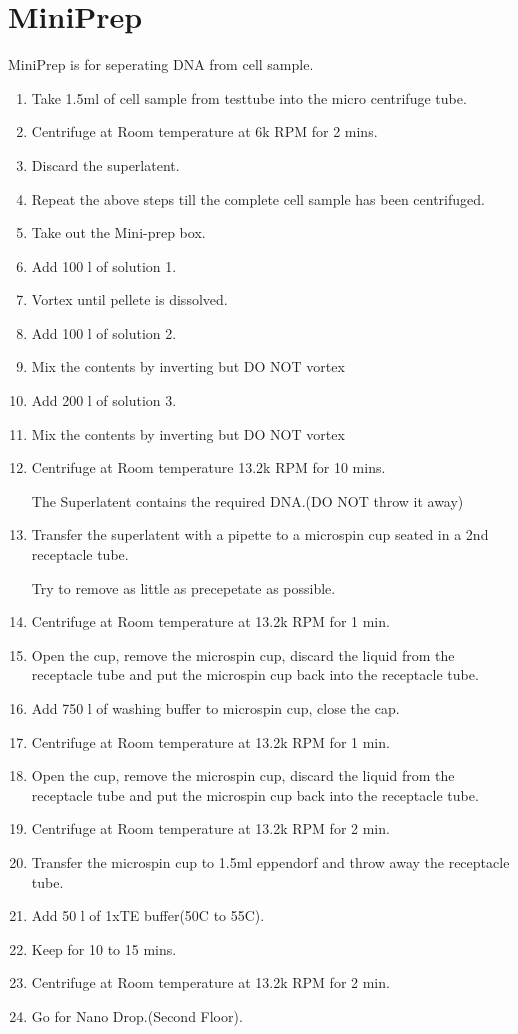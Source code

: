 \documentclass[11pt,twoside,a4paper]{article}
\begin{document}
\section{MiniPrep}
MiniPrep is for seperating DNA from cell sample.
\begin{enumerate}
	\item Take 1.5ml of cell sample from testtube into the micro centrifuge tube.
	\item Centrifuge at Room temperature at 6k RPM for 2 mins.
	\item Discard the superlatent.
	\item Repeat the above steps till the complete cell sample has been centrifuged.
	\item Take out the Mini-prep box.
	\item Add 100 \textmu{} l of solution 1.
	\item Vortex until pellete is dissolved.
	\item Add 100 \textmu{} l of solution 2.
	\item Mix the contents by inverting but DO NOT vortex
	\item Add 200 \textmu{} l of solution 3.
	\item Mix the contents by inverting but DO NOT vortex
	\item Centrifuge at Room temperature 13.2k RPM for 10 mins.

		The Superlatent contains the required DNA.(DO NOT throw it away)
	\item Transfer the superlatent with a pipette to a microspin cup seated in a 2nd receptacle tube.

		Try to remove as little as precepetate as possible.
	\item Centrifuge at Room temperature at 13.2k RPM for 1 min.
	\item Open the cup, remove the microspin cup, discard the liquid from the receptacle tube and put the microspin cup back into the receptacle tube.
	\item Add 750 \textmu{} l of washing buffer to microspin cup, close the cap.
	\item Centrifuge at Room temperature at 13.2k RPM for 1 min.
	\item Open the cup, remove the microspin cup, discard the liquid from the receptacle tube and put the microspin cup back into the receptacle tube.
	\item Centrifuge at Room temperature at 13.2k RPM for 2 min.
	\item Transfer the microspin cup to 1.5ml eppendorf and throw away the receptacle tube.
	\item Add 50 \textmu{} l of 1xTE buffer(50\textdegree C to 55\textdegree C).
	\item Keep for 10 to 15 mins.
	\item Centrifuge at Room temperature at 13.2k RPM for 2 min.
	\item Go for Nano Drop.(Second Floor).
\end{enumerate}
\end{document}
